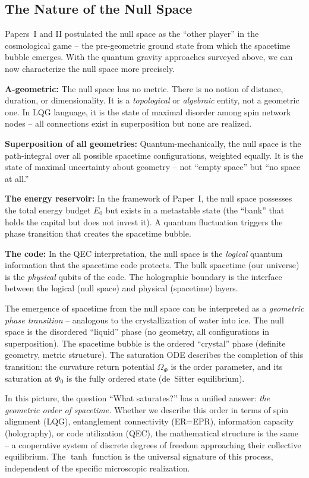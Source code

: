 \documentclass[aps,prd,twocolumn,superscriptaddress,nofootinbib]{revtex4-2}
\begin{document}
\subsection{The Nature of the Null Space}
\label{subsec:null_space}

Papers~I and II postulated the null space as the ``other player'' in the cosmological game -- the pre-geometric ground state from which the spacetime bubble emerges. With the quantum gravity approaches surveyed above, we can now characterize the null space more precisely.

\textbf{A-geometric:} The null space has no metric. There is no notion of distance, duration, or dimensionality. It is a \textit{topological} or \textit{algebraic} entity, not a geometric one. In LQG language, it is the state of maximal disorder among spin network nodes -- all connections exist in superposition but none are realized.

\textbf{Superposition of all geometries:} Quantum-mechanically, the null space is the path-integral over all possible spacetime configurations, weighted equally. It is the state of maximal uncertainty about geometry -- not ``empty space'' but ``no space at all.''

\textbf{The energy reservoir:} In the framework of Paper~I, the null space possesses the total energy budget $E_0$ but exists in a metastable state (the ``bank'' that holds the capital but does not invest it). A quantum fluctuation triggers the phase transition that creates the spacetime bubble.

\textbf{The code:} In the QEC interpretation, the null space is the \textit{logical} quantum information that the spacetime code protects. The bulk spacetime (our universe) is the \textit{physical} qubits of the code. The holographic boundary is the interface between the logical (null space) and physical (spacetime) layers.

The emergence of spacetime from the null space can be interpreted as a \textit{geometric phase transition} -- analogous to the crystallization of water into ice. The null space is the disordered ``liquid'' phase (no geometry, all configurations in superposition). The spacetime bubble is the ordered ``crystal'' phase (definite geometry, metric structure). The saturation ODE describes the completion of this transition: the curvature return potential $\Omega_\Phi$ is the order parameter, and its saturation at $\Phi_0$ is the fully ordered state (de~Sitter equilibrium).

In this picture, the question ``What saturates?'' has a unified answer: \textit{the geometric order of spacetime.} Whether we describe this order in terms of spin alignment (LQG), entanglement connectivity (ER=EPR), information capacity (holography), or code utilization (QEC), the mathematical structure is the same -- a cooperative system of discrete degrees of freedom approaching their collective equilibrium. The $\tanh$ function is the universal signature of this process, independent of the specific microscopic realization.
\end{document}
